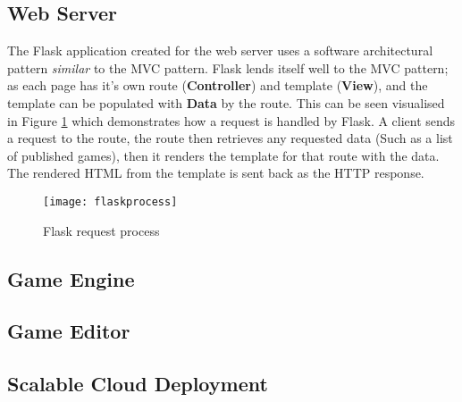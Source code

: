 	\subsection{Web Server}
	The Flask application created for the web server uses a software architectural pattern \emph{similar} to the MVC pattern. Flask lends itself well to the MVC pattern; as each page has it's own route (\textbf{Controller}) and template (\textbf{View}), and the template can be populated with \textbf{Data} by the route. This can be seen visualised in Figure \ref{fig:flaskprocess} which demonstrates how a request is handled by Flask. A client sends a request to the route, the route then retrieves any requested data (Such as a list of published games), then it renders the template for that route with the data. The rendered HTML from the template is sent back as the HTTP response.

	\begin{figure}[h]
		\centering
		\texttt{[image: flaskprocess]}
		\caption{Flask request process}
		\label{fig:flaskprocess}
	\end{figure}
	\subsection{Game Engine}
	\subsection{Game Editor}
	\subsection{Scalable Cloud Deployment}

